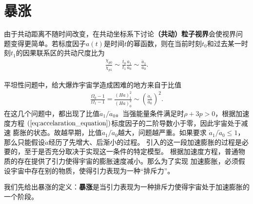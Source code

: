 \section{暴涨}
由于共动距离不随时间改变，在共动坐标系下讨论\textbf{（共动）粒子视界}会使视界问
题变得更简单。若标度因子$a(t)$是时间$t$的幂函数，则在当前时刻$t_0$和过去某一时刻$t_1$的因果联系区的共动尺度比为
\begin{align}
  \frac{\chi_{p 0}}{\chi_{p 1}}\sim \frac{t_0}{t_1}\frac{a_1}{a_0}
  \sim \frac{\dot{a}_1}{\dot{a}_0}.
\end{align}

平坦性问题中，给大爆炸宇宙学造成困难的地方来自于比值
\begin{align}
  \label{eq:flatness-of-space}
  \frac{\Omega_0-1}{\Omega_1-1}=
  \frac{{\left(Ha\right)}^2_{1}}{{\left(Ha\right)}^2_{0}}
  \sim {\left(\frac{\dot{a}_1}{\dot{a}_0}\right)}^2.
\end{align}
在这几个问题中，都出现了比值$\dot{a}_1 /
\dot{a}_0$。当强能量条件满足时$\rho+3p>0$，根据加速度方程
$(\ref{eq:accelaration_equation})$标度因子的二阶导数小于零，因此宇宙处于减速
膨胀的状态。故越早期，比值$\dot{a}_1 /\dot{a}_0$越大，问题越严重。如果要求
$\dot{a}_1 /\dot{a}_0\leq 1$，那么只能假设$\dot{a}$经历了先增大、后渐小的过程。
引入的这一段加速膨胀的过程是必要的，至于是否充分取决于实现这一条件的特定模型。
根据加速度方程，普通物质的存在提供了引力使得宇宙的膨胀速度减小。那么为了实现
加速膨胀，必须假设宇宙中存在别的物质，使得引力表现为一种“排斥力”。

我们先给出暴涨的定义：\textbf{暴涨}是当引力表现为一种排斥力使得宇宙处于加速膨胀的一个阶段。


